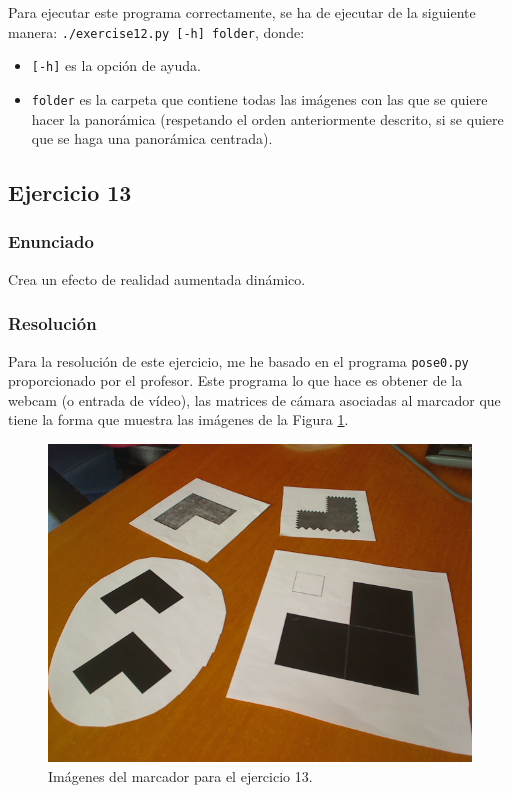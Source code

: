 \documentclass[a4paper,10pt,titlepage,oneside,openright]{book}
\begin{document}
Para ejecutar este programa correctamente, se ha de ejecutar de la siguiente manera: \texttt{./exercise12.py [-h] folder}, donde:
\begin{itemize}
 \item \texttt{[-h]} es la opción de ayuda.
 \item \texttt{folder} es la carpeta que contiene todas las imágenes con las que se quiere hacer la panorámica (respetando el orden anteriormente descrito, si se quiere que se haga una panorámica centrada).
\end{itemize}



\medskip
\subsection{Ejercicio 13}

\subsubsection*{Enunciado}
Crea un efecto de realidad aumentada dinámico.

\subsubsection*{Resolución}
Para la resolución de este ejercicio, me he basado en el programa \texttt{pose0.py} proporcionado por el profesor. Este programa lo que hace es obtener de la webcam (o entrada de vídeo), las matrices de cámara asociadas al marcador que tiene la forma que muestra las imágenes de la Figura \ref{marker}. 
\begin{figure}[!th]
\includegraphics[scale=0.2]{marker} 
\centering
\caption{Imágenes del marcador para el ejercicio 13.}
\label{marker}
\end{figure}
\end{document}
